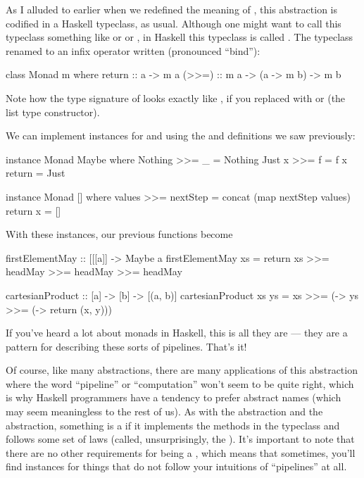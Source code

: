 As I alluded to earlier when we redefined the meaning of , this abstraction is
codified in a Haskell typeclass, as usual. Although one might want to call this typeclass something
like  or  or , in Haskell this typeclass is
called . The typeclass renamed  to an infix operator written
\inline{>>=} (pronounced ``bind''):
\begin{haskell}
class Monad m where
  return :: a -> m a
  (>>=) :: m a -> (a -> m b) -> m b
\end{haskell}
Note how the type signature of \inline{>>=} looks exactly like , if you replaced
 with  or \inline{[]} (the list type constructor).

We can implement  instances for  and \inline{[]} using the
 and  definitions we saw previously:
\begin{haskell}
instance Monad Maybe where
  Nothing >>= _ = Nothing
  Just x >>= f = f x
  return = Just

instance Monad [] where
  values >>= nextStep = concat (map nextStep values)
  return x = []
\end{haskell}
With these instances, our previous functions become
\begin{haskell}
firstElementMay :: [[[a]] -> Maybe a
firstElementMay xs =
  return xs >>= headMay 
            >>= headMay
            >>= headMay

cartesianProduct :: [a] -> [b] -> [(a, b)]
cartesianProduct xs ys =
  xs >>= (\x ->
  ys >>= (\y ->
  return (x, y)))
\end{haskell}

If you've heard a lot about monads in Haskell, this is all they are --- they are a pattern for
describing these sorts of pipelines. That's it! 

Of course, like many abstractions, there are many applications of this abstraction where the word
``pipeline'' or ``computation'' won't seem to be quite right, which is why Haskell programmers have
a tendency to prefer abstract names (which may seem meaningless to the rest of us). As with the
 abstraction and the  abstraction, something is a  if
it implements the methods in the typeclass and follows some set of laws (called, unsurprisingly, the
). It's important to note that there are no other requirements for being a
, which means that sometimes, you'll find  instances for things that do
not follow your intuitions of ``pipelines'' at all.

